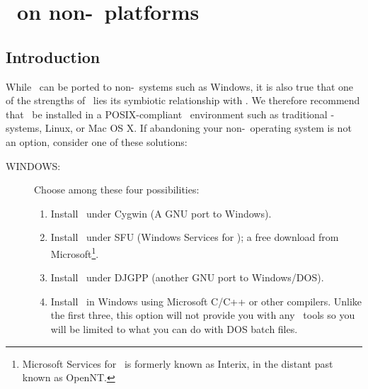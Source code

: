 %
%
\chapter{\gmt\ on non-\UNIX\ platforms}
\label{app:L}
\thispagestyle{headings}

\section{Introduction}

While \GMT\ can be ported to non-\UNIX\ systems such as
Windows, it is also true that one of the
strengths of \GMT\ lies its symbiotic relationship with
\UNIX.  We therefore recommend that \GMT\ be installed in
a POSIX-compliant \UNIX\ environment such as traditional \UNIX-systems, Linux,
or Mac OS X.  If abandoning your non-\UNIX\ operating system
is not an option, consider one of these solutions:

\begin{description}
\item [WINDOWS:] Choose among these four possibilities:

\begin{enumerate}

\item Install \GMT\ under Cygwin (A GNU port to Windows). 

\item Install \GMT\ under SFU (Windows Services for \UNIX); a free download from
Microsoft\footnote{Microsoft Services for \UNIX\ is formerly known as Interix, in the distant past known as OpenNT.}.

\item Install \GMT\ under DJGPP (another GNU port to Windows/DOS).

\item Install \GMT\ in Windows using Microsoft C/C++ or other
compilers.  Unlike the first three, this option will not provide you with any
\UNIX\ tools so you will be limited to what you can do with
DOS batch files.


\end{enumerate}

\end{description}

